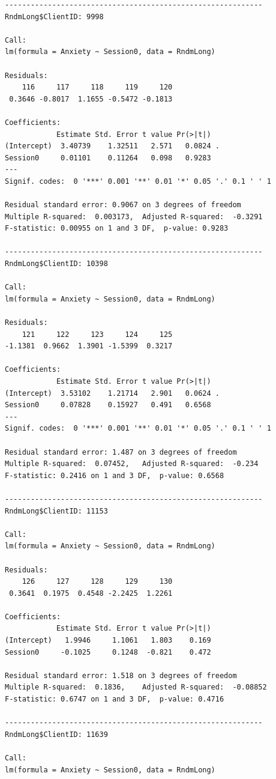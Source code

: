 \documentclass[
  english,
]{book}
\begin{document}
\begin{verbatim}
------------------------------------------------------------ 
RndmLong$ClientID: 9998

Call:
lm(formula = Anxiety ~ Session0, data = RndmLong)

Residuals:
    116     117     118     119     120 
 0.3646 -0.8017  1.1655 -0.5472 -0.1813 

Coefficients:
            Estimate Std. Error t value Pr(>|t|)  
(Intercept)  3.40739    1.32511   2.571   0.0824 .
Session0     0.01101    0.11264   0.098   0.9283  
---
Signif. codes:  0 '***' 0.001 '**' 0.01 '*' 0.05 '.' 0.1 ' ' 1

Residual standard error: 0.9067 on 3 degrees of freedom
Multiple R-squared:  0.003173,  Adjusted R-squared:  -0.3291 
F-statistic: 0.00955 on 1 and 3 DF,  p-value: 0.9283

------------------------------------------------------------ 
RndmLong$ClientID: 10398

Call:
lm(formula = Anxiety ~ Session0, data = RndmLong)

Residuals:
    121     122     123     124     125 
-1.1381  0.9662  1.3901 -1.5399  0.3217 

Coefficients:
            Estimate Std. Error t value Pr(>|t|)  
(Intercept)  3.53102    1.21714   2.901   0.0624 .
Session0     0.07828    0.15927   0.491   0.6568  
---
Signif. codes:  0 '***' 0.001 '**' 0.01 '*' 0.05 '.' 0.1 ' ' 1

Residual standard error: 1.487 on 3 degrees of freedom
Multiple R-squared:  0.07452,   Adjusted R-squared:  -0.234 
F-statistic: 0.2416 on 1 and 3 DF,  p-value: 0.6568

------------------------------------------------------------ 
RndmLong$ClientID: 11153

Call:
lm(formula = Anxiety ~ Session0, data = RndmLong)

Residuals:
    126     127     128     129     130 
 0.3641  0.1975  0.4548 -2.2425  1.2261 

Coefficients:
            Estimate Std. Error t value Pr(>|t|)
(Intercept)   1.9946     1.1061   1.803    0.169
Session0     -0.1025     0.1248  -0.821    0.472

Residual standard error: 1.518 on 3 degrees of freedom
Multiple R-squared:  0.1836,    Adjusted R-squared:  -0.08852 
F-statistic: 0.6747 on 1 and 3 DF,  p-value: 0.4716

------------------------------------------------------------ 
RndmLong$ClientID: 11639

Call:
lm(formula = Anxiety ~ Session0, data = RndmLong)


\end{verbatim}
\end{document}
